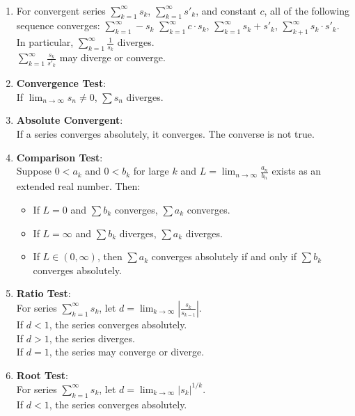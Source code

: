 \documentclass[12pt]{article}
\begin{document}
\begin{theorem}\label{th:ConvergenceReveries}
\ 
\begin{enumerate}
	\item For convergent series $\sum^{\infty}_{k=1} s_k$, $\sum^{\infty}_{k=1}s'_k$, and constant $c$, all of the following sequence converges:
		$\sum^{\infty}_{k=1}-s_k$ $\sum^{\infty}_{k=1}c\cdot s_k$, $\sum^{\infty}_{k=1}s_k+s'_k$, $\sum^{\infty}_{k+1}s_k\cdot s'_k$.\\
		In particular, $\sum^{\infty}_{k=1}\frac{1}{s_k}$ diverges.\\
		$\sum^{\infty}_{k=1}\frac{s_k}{s'_k}$ may diverge or converge.
	\item \textbf{Convergence Test}:\\
		If $\lim_{n \rightarrow \infty} s_n \neq 0$, $\sum s_n$ diverges.
	\item \label{th:ConvergenceReveries:en:absoluteconverge} \textbf{Absolute Convergent}:\\
		If a series converges absolutely, it converges. The converse is not true. 
	\item \textbf{Comparison Test}:\\
		Suppose $0<a_k$ and $0<b_k$ for large $k$ and $L = \lim_{n \rightarrow \infty} \frac{a_n}{b_n}$ exists as an extended real number. Then:
		\begin{itemize}
			\item If $L=0$ and $\sum b_k$ converges, $\sum a_k$ converges.
			\item If $L=\infty$ and $\sum b_k$ diverges, $\sum a_k$ diverges.
			\item If $L \in (0, \infty)$, then $\sum a_k$ converges absolutely if and only if $\sum b_k$ converges absolutely.
		\end{itemize}
	\item \textbf{Ratio Test}:\\
		For series $\sum^{\infty}_{k=1}s_k$, let $d=\lim_{k \to \infty} |\frac{s_k}{s_{k-1}}|$.\\
		If $d<1$, the series converges absolutely.\\
		If $d>1$, the series diverges.\\
		If $d=1$, the series may converge or diverge.
	\item \textbf{Root Test}:\\
		For series $\sum^{\infty}_{k=1}s_k$, let $d=\lim_{k \to \infty} |s_k|^{1/k}$.\\
		If $d<1$, the series converges absolutely.\\

\end{enumerate}
\end{theorem}
\end{document}
